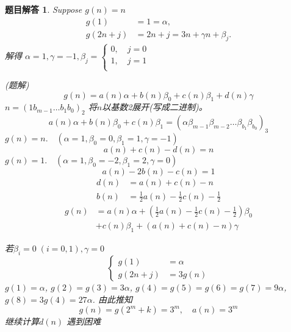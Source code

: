 \documentclass[mode=geye]{elegantnote}
\newtheorem{answer}{题目解答}
\begin{document}
\begin{answer}
	Suppose $ g(n) = n $
	\begin{equation*}
		\begin{aligned}
			g(1) 	&= 1 = \alpha,\\
			g(2n+j)	&= 2n+j = 3n+\gamma n+\beta_j.
		\end{aligned}
	\end{equation*}
解得 $   \alpha = 1, \gamma = -1, \beta_j = \left\{ \begin{array}{l}
	0,\quad j=0\\
	1,\quad j=1\\
\end{array}\right.$

(题解)
\begin{equation*}
	g(n) = a(n)\alpha + b(n)\beta_0 + c(n)\beta_1+d(n)\gamma
\end{equation*}
$ n = (1 b_{m-1}\dots b_1b_0)_2 $ 将$ n $以基数2展开(写成二进制)。\\
\begin{equation*}
	a(n)\alpha + b(n)\beta_0 + c(n)\beta_1 =  (\alpha\beta_{m-1}\beta_{m-2}\dots\beta_{b_1}\beta_{b_0})_3
\end{equation*}
$ g(n) = n.\quad (\alpha=1,\beta_0 = 0,\beta_1=1,  \gamma = -1 )$ 
\begin{equation*}
	a(n)+c(n)-d(n)=n
\end{equation*}
$ g(n)=1. \quad (\alpha=1,\beta_0 = -2,\beta_1=2, \gamma = 0)  $ 
\begin{equation*}
	a(n)-2b(n)-c(n)=1
\end{equation*}
\begin{align*}
	d(n)&=a(n)+c(n)-n\\
	b(n)&=\frac{1}{2}a(n)-\frac{1}{2}c(n)-\frac{1}{2}  
\end{align*}
\begin{align*}
	g(n)&=a(n)\alpha+(\frac{1}{2}a(n)-\frac{1}{2}c(n)-\frac{1}{2})\beta_0 \\
	&+ c(n)\beta_1 + (a(n)+c(n)-n)\gamma
\end{align*}

若$ \beta_i=0\;(i=0,1), \gamma=0 $ 
\begin{equation*}
	\left\{
		\begin{aligned}
			g(1)&=\alpha\\
			g(2n+j)&=3g(n)
		\end{aligned}
	\right.
\end{equation*}
$ g(1)=\alpha $, $ g(2)=g(3)=3\alpha $, $ g(4)=g(5)=g(6)=g(7)= 9\alpha $, 
$ g(8)=3g(4)=27\alpha $.
由此推知
\begin{equation*}
	g(n)=g(2^m+k)=3^m,\quad a(n)=3^m
\end{equation*}
继续计算$ d(n) $ 遇到困难


\end{answer}
\end{document}
